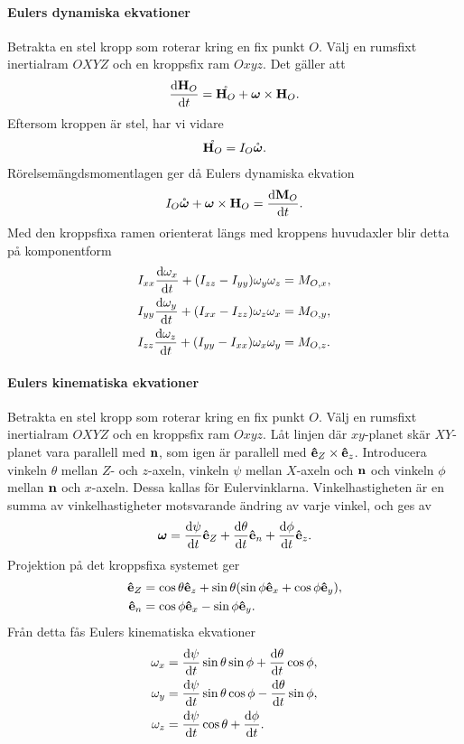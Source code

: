 \paragraph{Eulers dynamiska ekvationer}
Betrakta en stel kropp som roterar kring en fix punkt $O$. Välj en rumsfixt inertialram $OXYZ$ och en kroppsfix ram $Oxyz$. Det gäller att
\begin{align*}
	\dv{\vb{H}_{O}}{t} = \mathring{\vb{H}_{O}} + \vb*{\omega}\times\vb{H}_{O}.
\end{align*}
Eftersom kroppen är stel, har vi vidare
\begin{align*}
	\mathring{\vb{H}_{O}} = I_{O}\mathring{\vb*{\omega}}.
\end{align*}
Rörelsemängdsmomentlagen ger då Eulers dynamiska ekvation
\begin{align*}
	I_{O}\mathring{\vb*{\omega}} + \vb*{\omega}\times\vb{H}_{O} = \dv{\vb{M}_{O}}{t}.
\end{align*}
Med den kroppsfixa ramen orienterat längs med kroppens huvudaxler blir detta på komponentform
\begin{align*}
	I_{xx}\dv{\omega_{x}}{t} + (I_{zz} - I_{yy})\omega_{y}\omega_{z} &= M_{O, x}, \\
	I_{yy}\dv{\omega_{y}}{t} + (I_{xx} - I_{zz})\omega_{z}\omega_{x} &= M_{O, y}, \\
	I_{zz}\dv{\omega_{z}}{t} + (I_{yy} - I_{xx})\omega_{x}\omega_{y} &= M_{O, z}.
\end{align*}

\paragraph{Eulers kinematiska ekvationer}
Betrakta en stel kropp som roterar kring en fix punkt $O$. Välj en rumsfixt inertialram $OXYZ$ och en kroppsfix ram $Oxyz$. Låt linjen där $xy$-planet skär $XY$-planet vara parallell med $\vb{n}$, som igen är parallell med $\vu{e}_{Z}\times\vu{e}_{z}$. Introducera vinkeln $\theta$ mellan $Z$- och $z$-axeln, vinkeln $\psi$ mellan $X$-axeln och $\vb{n}$ och vinkeln $\phi$ mellan $\vb{n}$ och $x$-axeln. Dessa kallas för Eulervinklarna. Vinkelhastigheten är en summa av vinkelhastigheter motsvarande ändring av varje vinkel, och ges av
\begin{align*}
	\vb*{\omega} = \dv{\psi}{t}\vu{e}_{Z} + \dv{\theta}{t}\vu{e}_{n} + \dv{\phi}{t}\vu{e}_{z}.
\end{align*}
Projektion på det kroppsfixa systemet ger
\begin{align*}
	\vu{e}_{Z} &= \cos{\theta}\vu{e}_{z} + \sin{\theta}(\sin{\phi}\vu{e}_{x} + \cos{\phi}\vu{e}_{y}), \\
	\vu{e}_{n} &= \cos{\phi}\vu{e}_{x} - \sin{\phi}\vu{e}_{y}.
\end{align*}
Från detta fås Eulers kinematiska ekvationer
\begin{align*}
	\omega_{x} &= \dv{\psi}{t}\sin{\theta}\sin{\phi} + \dv{\theta}{t}\cos{\phi}, \\
	\omega_{y} &= \dv{\psi}{t}\sin{\theta}\cos{\phi} - \dv{\theta}{t}\sin{\phi}, \\
	\omega_{z} &= \dv{\psi}{t}\cos{\theta} + \dv{\phi}{t}.
\end{align*}

